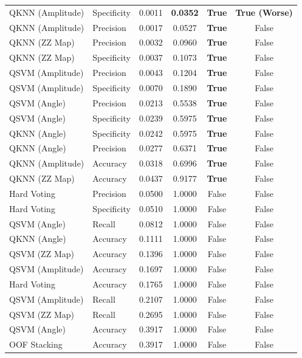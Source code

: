 \begin{longtable}{llcccc}
QKNN (Amplitude) & Specificity & 0.0011 & \textbf{0.0352} & \textbf{True} & \textbf{True (Worse)} \\
QKNN (Amplitude) & Precision   & 0.0017 & 0.0527 & \textbf{True} & False \\
QKNN (ZZ Map)    & Precision   & 0.0032 & 0.0960 & \textbf{True} & False \\
QKNN (ZZ Map)    & Specificity & 0.0037 & 0.1073 & \textbf{True} & False \\
QSVM (Amplitude) & Precision   & 0.0043 & 0.1204 & \textbf{True} & False \\
QSVM (Amplitude) & Specificity & 0.0070 & 0.1890 & \textbf{True} & False \\
QSVM (Angle)     & Precision   & 0.0213 & 0.5538 & \textbf{True} & False \\
QSVM (Angle)     & Specificity & 0.0239 & 0.5975 & \textbf{True} & False \\
QKNN (Angle)     & Specificity & 0.0242 & 0.5975 & \textbf{True} & False \\
QKNN (Angle)     & Precision   & 0.0277 & 0.6371 & \textbf{True} & False \\
QKNN (Amplitude) & Accuracy    & 0.0318 & 0.6996 & \textbf{True} & False \\
QKNN (ZZ Map)    & Accuracy    & 0.0437 & 0.9177 & \textbf{True} & False \\
Hard Voting      & Precision   & 0.0500 & 1.0000 & False & False \\
Hard Voting      & Specificity & 0.0510 & 1.0000 & False & False \\
QSVM (Angle)     & Recall      & 0.0812 & 1.0000 & False & False \\
QKNN (Angle)     & Accuracy    & 0.1111 & 1.0000 & False & False \\
QSVM (ZZ Map)    & Accuracy    & 0.1396 & 1.0000 & False & False \\
QSVM (Amplitude) & Accuracy    & 0.1697 & 1.0000 & False & False \\
Hard Voting      & Accuracy    & 0.1765 & 1.0000 & False & False \\
QSVM (Amplitude) & Recall      & 0.2107 & 1.0000 & False & False \\
QSVM (ZZ Map)    & Recall      & 0.2695 & 1.0000 & False & False \\
QSVM (Angle)     & Accuracy    & 0.3917 & 1.0000 & False & False \\
OOF Stacking     & Accuracy    & 0.3917 & 1.0000 & False & False \\

\end{longtable}
